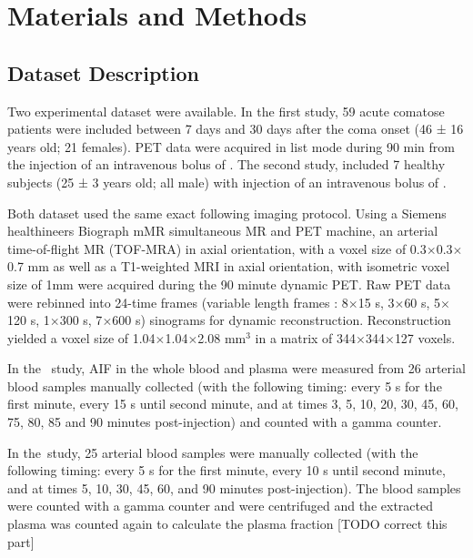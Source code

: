 \chapter{Materials and Methods}

\section{Dataset Description}
Two experimental dataset were available.
In the first study, 59 acute comatose patients were included between 7 days and 30 days after the coma onset (46 ± 16 years old; 21 females).
PET data were acquired in list mode during 90 min from the injection of an intravenous bolus of \fdg.
The second study, included 7 healthy subjects (25 ± 3 years old; all male) with injection of an intravenous bolus of \yohimbine.

Both dataset used the same exact following imaging protocol.
Using a Siemens healthineers Biograph mMR simultaneous MR and PET machine, an arterial time-of-flight MR (TOF-MRA) in axial orientation, with a voxel size of 0.3$\times$0.3$\times$0.7 mm as well as a T1-weighted MRI in axial orientation, with isometric voxel size of 1mm were acquired during the 90 minute dynamic PET.
Raw PET data were rebinned into 24-time frames (variable length frames : 8$\times$15 s, 3$\times$60 s, 5$\times$120 s, 1$\times$300 s, 7$\times$600 s) sinograms for dynamic reconstruction.
Reconstruction yielded a voxel size of 1.04$\times$1.04$\times$2.08 mm$^3$ in a matrix of 344$\times$344$\times$127 voxels.

In the \fdg$\,$ study, AIF in the whole blood and plasma were measured from 26 arterial blood samples manually collected (with the following timing: every 5 s for the first minute, every 15 s until second minute, and at times 3, 5, 10, 20, 30, 45, 60, 75, 80, 85 and 90 minutes post-injection) and counted with a gamma counter.  

In the \yohimbine $\,$study, 25 arterial blood samples were manually collected (with the following timing: every 5 s for the first minute, every 10 s until second minute, and at times 5, 10, 30, 45, 60, and 90 minutes post-injection).
The blood samples were counted with a gamma counter and were centrifuged and the extracted plasma was counted again to calculate the plasma fraction [TODO correct this part]




